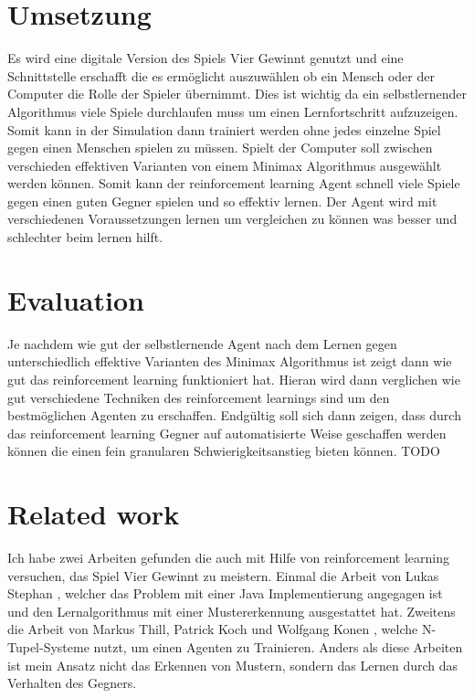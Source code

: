 \section{Umsetzung}

Es wird eine digitale Version des Spiels Vier Gewinnt genutzt und eine Schnittstelle erschafft die es ermöglicht auszuwählen ob ein Mensch oder der Computer die Rolle der Spieler übernimmt. Dies ist wichtig da ein selbstlernender Algorithmus viele Spiele durchlaufen muss um einen Lernfortschritt aufzuzeigen. Somit kann in der Simulation dann trainiert werden ohne jedes einzelne Spiel gegen einen Menschen spielen zu müssen. Spielt der Computer soll zwischen verschieden effektiven Varianten von einem Minimax Algorithmus ausgewählt werden können. Somit kann der reinforcement learning Agent schnell viele Spiele gegen einen guten Gegner spielen und so effektiv lernen. 
Der Agent wird mit verschiedenen Voraussetzungen lernen um vergleichen zu können was besser und schlechter beim lernen hilft.


\section{Evaluation}
Je nachdem wie gut der selbstlernende Agent nach dem Lernen gegen unterschiedlich effektive Varianten des Minimax Algorithmus ist zeigt dann wie gut das reinforcement learning funktioniert hat.
Hieran wird dann verglichen wie gut verschiedene Techniken des reinforcement learnings sind um den bestmöglichen Agenten zu erschaffen.
Endgültig soll sich dann zeigen, dass durch das reinforcement learning Gegner auf automatisierte Weise geschaffen werden können die einen fein granularen Schwierigkeitsanstieg bieten können. \colorbox{red!30}{TODO}

\section{Related work}
Ich habe zwei Arbeiten gefunden die auch mit Hilfe von reinforcement learning versuchen, das Spiel Vier Gewinnt zu meistern. Einmal die Arbeit von Lukas Stephan \cite{Stephan2018}, welcher das Problem mit einer Java Implementierung angegagen ist und den Lernalgorithmus mit einer Mustererkennung ausgestattet hat. Zweitens die Arbeit von Markus Thill, Patrick Koch und Wolfgang Konen \cite{Thill2012}, welche N-Tupel-Systeme nutzt, um einen Agenten zu Trainieren. Anders als diese Arbeiten ist mein Ansatz nicht das Erkennen von Mustern, sondern das Lernen durch das Verhalten des Gegners.









